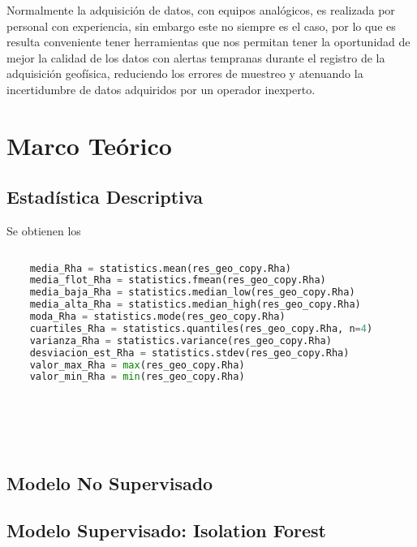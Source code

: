 \documentclass[sn-mathphys,Numbered]{sn-jnl}%
\theoremstyle{thmstyleone}%
\theoremstyle{thmstyletwo}%
\theoremstyle{thmstylethree}%
\begin{document}
Normalmente la adquisición de datos, con equipos analógicos, es realizada por personal con experiencia, sin embargo este no siempre es el caso, por lo que es resulta conveniente tener herramientas que nos permitan tener la oportunidad de mejor la calidad de los datos con alertas tempranas durante el registro de la adquisición geofísica, reduciendo los errores de muestreo y atenuando la incertidumbre de datos adquiridos por un operador inexperto.

\section{Marco Teórico}\label{sec2}



\subsection{Estadística Descriptiva}\label{subsec1}

Se obtienen los 

\begin{lstlisting}[language=python]
	
	media_Rha = statistics.mean(res_geo_copy.Rha)
	media_flot_Rha = statistics.fmean(res_geo_copy.Rha)
	media_baja_Rha = statistics.median_low(res_geo_copy.Rha)
	media_alta_Rha = statistics.median_high(res_geo_copy.Rha)
	moda_Rha = statistics.mode(res_geo_copy.Rha)
	cuartiles_Rha = statistics.quantiles(res_geo_copy.Rha, n=4)
	varianza_Rha = statistics.variance(res_geo_copy.Rha)
	desviacion_est_Rha = statistics.stdev(res_geo_copy.Rha)
	valor_max_Rha = max(res_geo_copy.Rha)
	valor_min_Rha = min(res_geo_copy.Rha)
	
\end{lstlisting}





\begin{lstlisting}
	
	
	
\end{lstlisting}


\subsection{Modelo No Supervisado}\label{subsec2}

\subsection{Modelo Supervisado: Isolation Forest}\label{subsec3}
\end{document}
